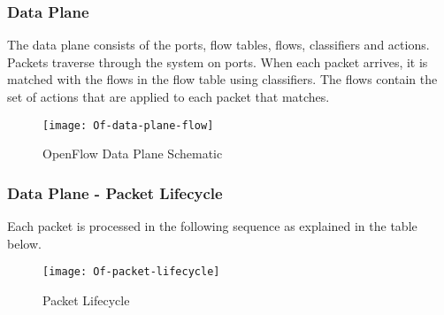 \subsubsection{Data Plane \cite{Opnflow_switch}} \label{of_data_plane}

The data plane consists of the ports, flow tables, flows, classifiers and actions. Packets traverse through the system on ports. When each packet arrives, it is matched with the flows in the flow table using classifiers. The flows contain the set of actions that are applied to each packet that matches.

\begin{figure}[H]
	\centering
	\texttt{[image: Of-data-plane-flow]}
	\caption{OpenFlow Data Plane Schematic \cite{Of_data_plane_flow_img}} \label{fig:Of_data_plane_img}
	\vspace{-10pt}
\end{figure}

\subsubsection{Data Plane - Packet Lifecycle \cite{Opnflow_switch}} \label{of_data_plane_lifecycle}

Each packet is processed in the following sequence as explained in the table below.
\begin{figure}[H]
	\centering
	\texttt{[image: Of-packet-lifecycle]}
	\caption {Packet Lifecycle \cite{Of_packet_lifecycle}}
	\label{fig:of_packet_lifecycle}
	\vspace{-10pt}
\end{figure}

